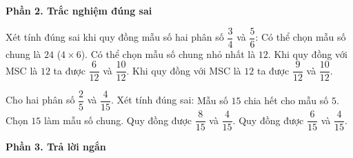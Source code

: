 \textbf{Phần 2. Trắc nghiệm đúng sai}

\begin{ex} %
Xét tính đúng sai khi quy đồng mẫu số hai phân số $\dfrac{3}{4}$ và $\dfrac{5}{6}$:
\choiceTF
{\True Có thể chọn mẫu số chung là $24$ ($4 \times 6$).}
{\True Có thể chọn mẫu số chung nhỏ nhất là $12$.}
{Khi quy đồng với MSC là $12$ ta được $\dfrac{6}{12}$ và $\dfrac{10}{12}$.}
{\True Khi quy đồng với MSC là $12$ ta được $\dfrac{9}{12}$ và $\dfrac{10}{12}$.}
\end{ex}

\begin{ex} %
Cho hai phân số $\dfrac{2}{5}$ và $\dfrac{4}{15}$. Xét tính đúng sai:
\choiceTF
{\True Mẫu số $15$ chia hết cho mẫu số $5$.}
{\True Chọn $15$ làm mẫu số chung.}
{Quy đồng được $\dfrac{8}{15}$ và $\dfrac{4}{15}$.}
{\True Quy đồng được $\dfrac{6}{15}$ và $\dfrac{4}{15}$.}
\end{ex}

\textbf{Phần 3. Trả lời ngắn}

